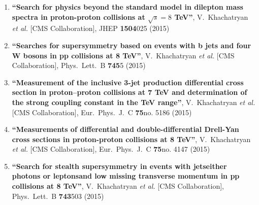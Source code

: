 \begin{enumerate}
\item%
{\bf ``Search for physics beyond the standard model in dilepton mass spectra in proton-proton collisions at $ \sqrt{s}=8 $ TeV''}, 
  V.~Khachatryan {\it et al.}  [CMS Collaboration], 
JHEP {\bf 1504}025 (2015) %


\item%
{\bf ``Searches for supersymmetry based on events with b jets and four W bosons in pp collisions at 8 TeV''}, 
  V.~Khachatryan {\it et al.}  [CMS Collaboration], 
Phys.\ Lett.\ B {\bf 745}5 (2015) %


\item%
{\bf ``Measurement of the inclusive 3-jet production differential cross section in proton–proton collisions at 7 TeV and determination of the strong coupling constant in the TeV range''}, 
  V.~Khachatryan {\it et al.}  [CMS Collaboration], 
Eur.\ Phys.\ J.\ C {\bf 75}no. 5186 (2015) %


\item%
{\bf ``Measurements of differential and double-differential Drell-Yan cross sections in proton-proton collisions at 8 TeV''}, 
  V.~Khachatryan {\it et al.}  [CMS Collaboration], 
Eur.\ Phys.\ J.\ C {\bf 75}no. 4147 (2015) %


\item%
{\bf ``Search for stealth supersymmetry in events with jetseither photons or leptonsand low missing transverse momentum in pp collisions at 8 TeV''}, 
  V.~Khachatryan {\it et al.}  [CMS Collaboration], 
Phys.\ Lett.\ B {\bf 743}503 (2015) %



\end{enumerate}
